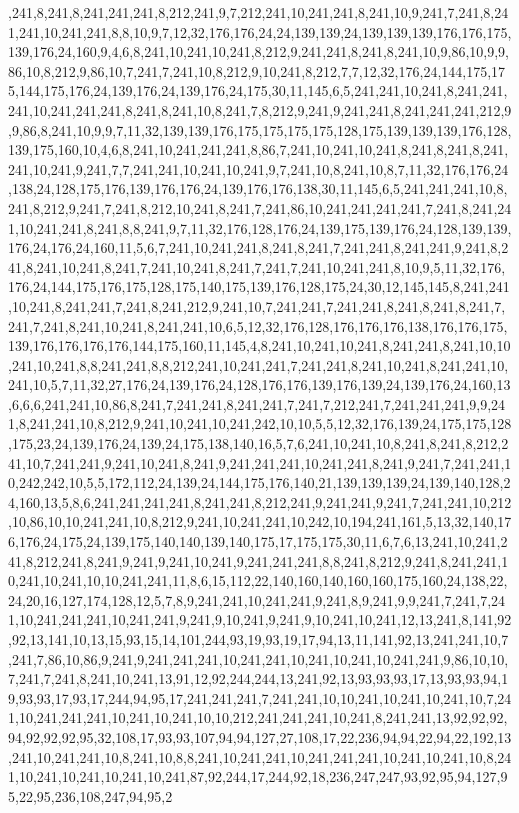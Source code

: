 ,241,8,241,8,241,241,241,8,212,241,9,7,212,241,10,241,241,8,241,10,9,241,7,241,8,241,241,10,241,241,8,8,10,9,7,12,32,176,176,24,24,139,139,24,139,139,139,176,176,175,139,176,24,160,9,4,6,8,241,10,241,10,241,8,212,9,241,241,8,241,8,241,10,9,86,10,9,9,86,10,8,212,9,86,10,7,241,7,241,10,8,212,9,10,241,8,212,7,7,12,32,176,24,144,175,175,144,175,176,24,139,176,24,139,176,24,175,30,11,145,6,5,241,241,10,241,8,241,241,241,10,241,241,241,8,241,8,241,10,8,241,7,8,212,9,241,9,241,241,8,241,241,241,212,9,9,86,8,241,10,9,9,7,11,32,139,139,176,175,175,175,175,128,175,139,139,139,176,128,139,175,160,10,4,6,8,241,10,241,241,241,8,86,7,241,10,241,10,241,8,241,8,241,8,241,241,10,241,9,241,7,7,241,241,10,241,10,241,9,7,241,10,8,241,10,8,7,11,32,176,176,24,138,24,128,175,176,139,176,176,24,139,176,176,138,30,11,145,6,5,241,241,241,10,8,241,8,212,9,241,7,241,8,212,10,241,8,241,7,241,86,10,241,241,241,241,7,241,8,241,241,10,241,241,8,241,8,8,241,9,7,11,32,176,128,176,24,139,175,139,176,24,128,139,139,176,24,176,24,160,11,5,6,7,241,10,241,241,8,241,8,241,7,241,241,8,241,241,9,241,8,241,8,241,10,241,8,241,7,241,10,241,8,241,7,241,7,241,10,241,241,8,10,9,5,11,32,176,176,24,144,175,176,175,128,175,140,175,139,176,128,175,24,30,12,145,145,8,241,241,10,241,8,241,241,7,241,8,241,212,9,241,10,7,241,241,7,241,241,8,241,8,241,8,241,7,241,7,241,8,241,10,241,8,241,241,10,6,5,12,32,176,128,176,176,176,138,176,176,175,139,176,176,176,176,144,175,160,11,145,4,8,241,10,241,10,241,8,241,241,8,241,10,10,241,10,241,8,8,241,241,8,8,212,241,10,241,241,7,241,241,8,241,10,241,8,241,241,10,241,10,5,7,11,32,27,176,24,139,176,24,128,176,176,139,176,139,24,139,176,24,160,13,6,6,6,241,241,10,86,8,241,7,241,241,8,241,241,7,241,7,212,241,7,241,241,241,9,9,241,8,241,241,10,8,212,9,241,10,241,10,241,242,10,10,5,5,12,32,176,139,24,175,175,128,175,23,24,139,176,24,139,24,175,138,140,16,5,7,6,241,10,241,10,8,241,8,241,8,212,241,10,7,241,241,9,241,10,241,8,241,9,241,241,241,10,241,241,8,241,9,241,7,241,241,10,242,242,10,5,5,172,112,24,139,24,144,175,176,140,21,139,139,139,24,139,140,128,24,160,13,5,8,6,241,241,241,241,8,241,241,8,212,241,9,241,241,9,241,7,241,241,10,212,10,86,10,10,241,241,10,8,212,9,241,10,241,241,10,242,10,194,241,161,5,13,32,140,176,176,24,175,24,139,175,140,140,139,140,175,17,175,175,30,11,6,7,6,13,241,10,241,241,8,212,241,8,241,9,241,9,241,10,241,9,241,241,241,8,8,241,8,212,9,241,8,241,241,10,241,10,241,10,10,241,241,11,8,6,15,112,22,140,160,140,160,160,175,160,24,138,22,24,20,16,127,174,128,12,5,7,8,9,241,241,10,241,241,9,241,8,9,241,9,9,241,7,241,7,241,10,241,241,241,10,241,241,9,241,9,10,241,9,241,9,10,241,10,241,12,13,241,8,141,92,92,13,141,10,13,15,93,15,14,101,244,93,19,93,19,17,94,13,11,141,92,13,241,241,10,7,241,7,86,10,86,9,241,9,241,241,241,10,241,241,10,241,10,241,10,241,241,9,86,10,10,7,241,7,241,8,241,10,241,13,91,12,92,244,244,13,241,92,13,93,93,93,17,13,93,93,94,19,93,93,17,93,17,244,94,95,17,241,241,241,7,241,241,10,10,241,10,241,10,241,10,7,241,10,241,241,241,10,241,10,241,10,10,212,241,241,241,10,241,8,241,241,13,92,92,92,94,92,92,92,95,32,108,17,93,93,107,94,94,127,27,108,17,22,236,94,94,22,94,22,192,13,241,10,241,241,10,8,241,10,8,8,241,10,241,241,10,241,241,241,10,241,10,241,10,8,241,10,241,10,241,10,241,10,241,87,92,244,17,244,92,18,236,247,247,93,92,95,94,127,95,22,95,236,108,247,94,95,2
